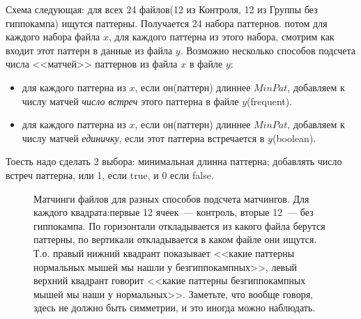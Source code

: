\documentclass[12pt]{report}
\author{Вишневский~Валерий~Викторович}
\begin{document}
\newcommand{\Var}{\mathsf{var}}
\newcommand{\Erf}{\mathsf{erf}}

Схема следующая: для всех 24 файлов(12 из Контроля, 12 из Группы без гиппокампа) ищутся паттерны.
Получается 24 набора паттернов. потом для каждого набора файла $x$, для каждого паттерна из этого набора, смотрим как входит этот
паттерн в данные из файла $y$.
Возможно несколько способов подсчета числа <<матчей>> паттернов из файла $x$ в файле $y$:
\begin{itemize}
 \item 
для каждого паттерна из $x$, если он(паттерн) длиннее $MinPat$, добавляем к числу матчей {\em число встреч }
этого паттерна в файле $y$(frequent).
\item
для каждого паттерна из $x$, если он(паттерн) длиннее $MinPat$, добавляем к числу матчей {\em единичку}, если
этот паттерна встречается в $y$(boolean).
\end{itemize}
Тоесть надо сделать 2 выбора:
минимальная длинна паттерна; добавлять число встреч паттерна, или 1, если true, и 0 если false.

\begin{figure}[h]
\noindent{}
\caption{ Матчинги файлов для разных способов подсчета матчингов. Для каждого квадрата:первые 12 ячеек~--- контроль, вторые 12~--- без гиппокампа. 
По горизонтали откладывается из какого файла берутся паттерны, по вертикали откладывается в каком файле они ищутся. Т.о. правый нижний квадрант 
показывает <<какие паттерны нормальных мышей мы нашли у безгиппокампных>>, левый верхний квадрант говорит <<какие паттерны безгиппокампных
мышей мы наши у нормальных>>. Заметьте, что вообще говоря, здесь не должно быть симметрии, и это иногда можно наблюдать.
}
\end{figure}
\end{document}
